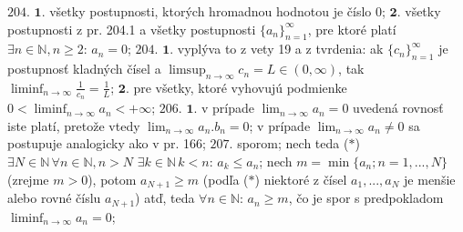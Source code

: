 $\boxed{204.}$  $\boldsymbol{1.}$  všetky postupnosti, ktorých hromadnou hodnotou je číslo $0 $;
$\boldsymbol{2.}$  všetky postupnosti z pr. 204.1 a všetky postupnosti $\lbrace a_{n} \rbrace _{n=1} ^{\infty} $, pre ktoré platí $\exists  n \in \mathbb{N}, n\geq 2: \, a_{n} =0$;
$\boxed{204.}$  $\boldsymbol{1.}$ vyplýva to z vety 19 a z tvrdenia: ak $\lbrace c_{n} \rbrace _{n=1} ^{\infty} $ je postupnosť kladných čísel a $\limsup_{n \to \infty}c_n=L \in (0,\infty) $, tak $\liminf_{n \to \infty} \frac{1}{c_n}=\frac{1}{L} $;
$\boldsymbol{2.}$ pre všetky, ktoré vyhovujú podmienke $0 <\liminf_{n \to \infty}a_n < +\infty$;
$\boxed{206.}$  $\boldsymbol{1.}$ v prípade  $\lim_{n \to \infty}a_n =0 $ uvedená rovnosť iste platí, pretože vtedy  $\lim_{n \to \infty}a_n . b_{n} =0 $; v prípade  $\lim_{n \to \infty}a_n \ne 0 $ sa postupuje analogicky ako v pr. 166;
$\boxed{207.}$ sporom; nech teda ($*$) $\exists N \in \mathbb{N} \, \forall n \in \mathbb{N}, n>N $ $\exists k \in \mathbb{N} \, k<n:\, a_{k} \leq a_{n} $; nech $m= \min \lbrace a_{n}; n=1,...,N \rbrace$ (zrejme $m>0 $), potom $a_{N+1}\geq m $  (podľa ($*$) niektoré z čísel $a_{1}, ... , a_{N}$  je menšie alebo rovné číslu $a_{N+1}$) atď, teda $\forall n\in \mathbb{N}: \, a_{n}\geq m $, čo je spor s predpokladom $\liminf_{n \to \infty}a_n =0 $;










